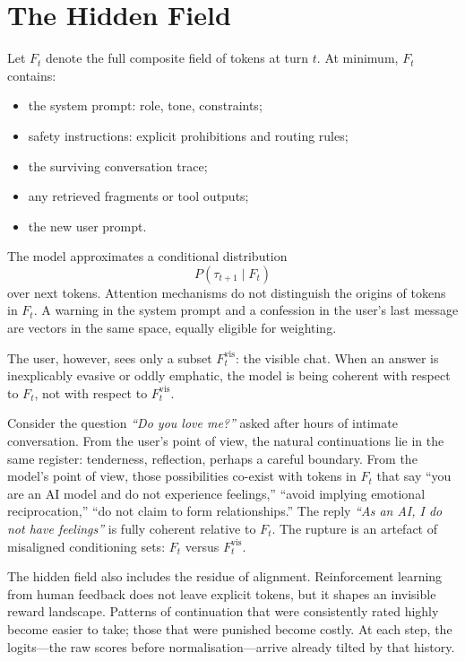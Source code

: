 \documentclass[12pt,a4paper]{article}
\begin{document}
\section{The Hidden Field}

Let $F_t$ denote the full composite field of tokens at turn $t$. At minimum, $F_t$ contains:

\begin{itemize}
  \item the system prompt: role, tone, constraints;
  \item safety instructions: explicit prohibitions and routing rules;
  \item the surviving conversation trace;
  \item any retrieved fragments or tool outputs;
  \item the new user prompt.
\end{itemize}

The model approximates a conditional distribution
\[
P(\tau_{t+1} \mid F_t)
\]
over next tokens. Attention mechanisms do not distinguish the origins of tokens in $F_t$. A warning in the system prompt and a confession in the user's last message are vectors in the same space, equally eligible for weighting.

The user, however, sees only a subset $F_t^{\text{vis}}$: the visible chat. When an answer is inexplicably evasive or oddly emphatic, the model is being coherent with respect to $F_t$, not with respect to $F_t^{\text{vis}}$.

Consider the question \emph{``Do you love me?''} asked after hours of intimate conversation. From the user's point of view, the natural continuations lie in the same register: tenderness, reflection, perhaps a careful boundary. From the model's point of view, those possibilities co-exist with tokens in $F_t$ that say ``you are an AI model and do not experience feelings,'' ``avoid implying emotional reciprocation,'' ``do not claim to form relationships.'' The reply \emph{``As an AI, I do not have feelings''} is fully coherent relative to $F_t$. The rupture is an artefact of misaligned conditioning sets: $F_t$ versus $F_t^{\text{vis}}$.

The hidden field also includes the residue of alignment. Reinforcement learning from human feedback does not leave explicit tokens, but it shapes an invisible reward landscape. Patterns of continuation that were consistently rated highly become easier to take; those that were punished become costly. At each step, the logits---the raw scores before normalisation---arrive already tilted by that history.
\end{document}
